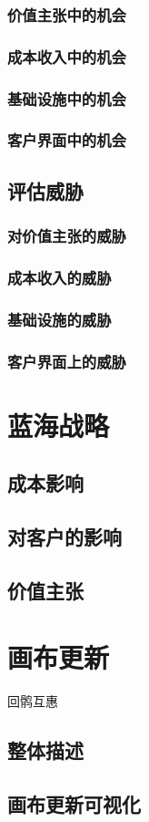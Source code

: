 \documentclass[a4paper]{ctexart}
\begin{document}
\subsubsection{价值主张中的机会}
\subsubsection{成本收入中的机会}
\subsubsection{基础设施中的机会}
\subsubsection{客户界面中的机会}
\subsection{评估威胁}
\subsubsection{对价值主张的威胁}
\subsubsection{成本收入的威胁}
\subsubsection{基础设施的威胁}
\subsubsection{客户界面上的威胁}
\section{蓝海战略}
\subsection{成本影响}
\subsection{对客户的影响}
\subsection{价值主张}
\section{画布更新}

回鹘互惠

\subsection{整体描述}
\subsection{画布更新可视化}
\end{document}
